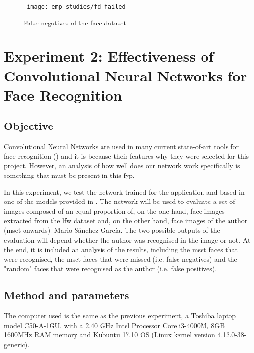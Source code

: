 	\begin{figure}[!ht]
		\centering
		\texttt{[image: emp\_studies/fd\_failed]}
		\caption{False negatives of the face dataset}
		\label{fig:failed_detection}
	\end{figure}



                                                       

\section{Experiment 2: Effectiveness of Convolutional Neural Networks for Face Recognition}
	\subsection{Objective}
	Convolutional Neural Networks are used in many current state-of-art tools for face recognition (\cite{facenet_article}) and it is because their features why they were selected for this project. However, an analysis of how well does our network work specifically is something that must be present in this \gls{fyp}. 

	In this experiment, we test the network trained for the application and based in one of the models provided in \cite{facenet_github}. The network will be used to evaluate a set of images composed of an equal proportion of, on the one hand, face images extracted from the \gls{lfw} dataset and, on the other hand, face images of the author (\gls{mset} onwards), Mario Sánchez García. The two possible outputs of the evaluation will depend whether the author was recognised in the image or not. At the end, it is included an analysis of the results, including the \gls{mset} faces that were recognised, the \gls{mset} faces that were missed (i.e. false negatives) and the "random" faces that were recognised as the author (i.e. false positives). 

	\subsection{Method and parameters}
	The computer used is the same as the previous experiment, a Toshiba laptop model C50-A-1GU, with a 2,40 GHz Intel Processor Core i3-4000M, 8GB 1600MHz RAM memory and Kubuntu 17.10 OS (Linux kernel version 4.13.0-38-generic). 

